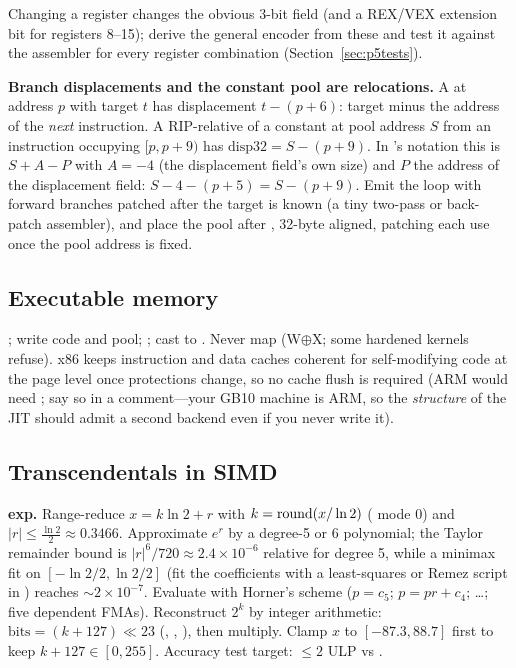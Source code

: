 Changing a register changes the obvious 3-bit field (and a REX/VEX extension bit for registers 8--15); derive the general encoder from these and test it against the assembler for every register combination (Section~\ref{sec:p5tests}).

\textbf{Branch displacements and the constant pool are relocations.} A  at address $p$ with target $t$ has displacement $t - (p + 6)$: target minus the address of the \emph{next} instruction. A RIP-relative  of a constant at pool address $S$ from an instruction occupying $[p, p+9)$ has $\text{disp32} = S - (p+9)$. In \csapp's notation this is $S + A - P$ with $A = -4$ (the displacement field's own size) and $P$ the address of the displacement field: $S - 4 - (p+5) = S - (p+9)$. Emit the loop with forward branches patched after the target is known (a tiny two-pass or back-patch assembler), and place the pool after , 32-byte aligned, patching each use once the pool address is fixed.

\subsection{Executable memory}

; write code and pool; ; cast to . Never map  (W$\oplus$X; some hardened kernels refuse). x86 keeps instruction and data caches coherent for self-modifying code at the page level once protections change, so no cache flush is required (ARM would need ; say so in a comment---your GB10 machine is ARM, so the \emph{structure} of the JIT should admit a second backend even if you never write it).

\subsection{Transcendentals in SIMD}

\textbf{exp.} Range-reduce $x = k\ln 2 + r$ with $k = \operatorname{round}(x/\ln 2)$ ( mode 0) and $|r| \le \tfrac{\ln 2}{2}\approx 0.3466$. Approximate $e^r$ by a degree-5 or 6 polynomial; the Taylor remainder bound is $|r|^6/720 \approx 2.4\times10^{-6}$ relative for degree 5, while a minimax fit on $[-\ln2/2, \ln2/2]$ (fit the coefficients with a least-squares or Remez script in ) reaches $\sim 2\times 10^{-7}$. Evaluate with Horner's scheme ($p = c_5$; $p = p r + c_4$; \ldots; five dependent FMAs). Reconstruct $2^k$ by integer arithmetic: $\text{bits} = (k + 127) \ll 23$ (, , ), then multiply. Clamp $x$ to $[-87.3, 88.7]$ first to keep $k+127\in[0,255]$. Accuracy test target: $\le 2$ ULP vs .

